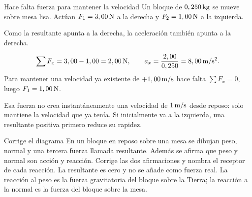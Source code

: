\documentclass[10pt,a4paper]{article}
\begin{document}
\begin{examplebox}{Hace falta fuerza para mantener la velocidad}
Un bloque de $0,250\,\mathrm{kg}$ se mueve sobre mesa lisa. Act\'uan $F_1=3,00\,\mathrm{N}$ a la derecha y $F_2=1,00\,\mathrm{N}$ a la izquierda.

 Como la resultante apunta a la derecha, la aceleraci\'on tambi\'en apunta a la derecha.

\[
\sum F_x=3,00-1,00=2,00\,\mathrm{N},\qquad a_x=\frac{2,00}{0,250}=8,00\,\mathrm{m/s^2}.
\]
Para mantener una velocidad ya existente de $+1,00\,\mathrm{m/s}$ hace falta $\sum F_x=0$, luego $F_1=1,00\,\mathrm{N}$.

 Esa fuerza no crea instant\'aneamente una velocidad de $1\,\mathrm{m/s}$ desde reposo: solo mantiene la velocidad que ya ten\'ia. Si inicialmente va a la izquierda, una resultante positiva primero reduce su rapidez.
\end{examplebox}

\begin{exercisebox}{Corrige el diagrama}
En un bloque en reposo sobre una mesa se dibujan peso, normal y una tercera fuerza llamada resultante. Adem\'as se afirma que peso y normal son acci\'on y reacci\'on. Corrige las dos afirmaciones y nombra el receptor de cada reacci\'on.
\solutionblock La resultante es cero y no se a\~nade como fuerza real. La reacci\'on al peso es la fuerza gravitatoria del bloque sobre la Tierra; la reacci\'on a la normal es la fuerza del bloque sobre la mesa.
\end{exercisebox}

\clearpage

\end{document}

